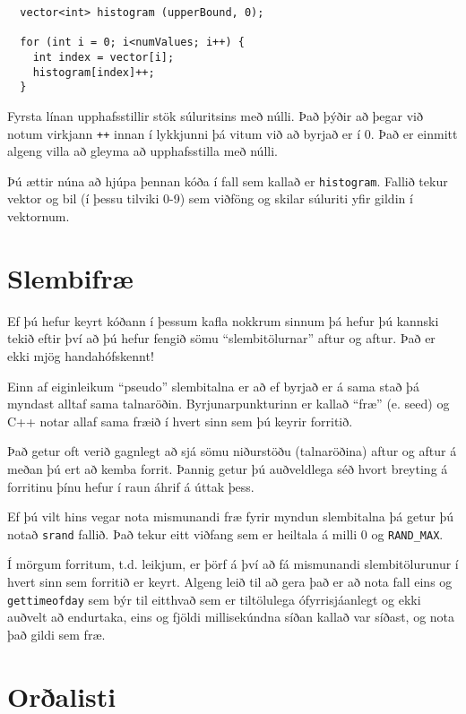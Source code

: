 \begin{verbatim}
  vector<int> histogram (upperBound, 0);

  for (int i = 0; i<numValues; i++) {
    int index = vector[i];
    histogram[index]++;
  }
\end{verbatim}
%
Fyrsta línan upphafsstillir stök súluritsins með núlli.
Það þýðir að þegar við notum virkjann {\tt ++} innan í lykkjunni þá vitum við að byrjað er í 0.
Það er einmitt algeng villa að gleyma að upphafsstilla með núlli.

Þú ættir núna að hjúpa þennan kóða í fall sem kallað er {\tt histogram}.
Fallið tekur vektor og bil (í þessu tilviki 0-9) sem viðföng og skilar súluriti yfir gildin í vektornum.

\section{Slembifræ}

Ef þú hefur keyrt kóðann í þessum kafla nokkrum sinnum þá hefur þú kannski tekið eftir því að þú hefur fengið sömu ``slembitölurnar'' aftur og aftur.
Það er ekki mjög handahófskennt!

Einn af eiginleikum ``pseudo'' slembitalna er að ef byrjað er á sama stað þá myndast alltaf sama talnaröðin.
Byrjunarpunkturinn er kallað ``fræ'' (e. seed) og C++ notar allaf sama fræið í hvert sinn sem þú keyrir forritið.

Það getur oft verið gagnlegt að sjá sömu niðurstöðu (talnaröðina) aftur og aftur á meðan þú ert að kemba forrit.
Þannig getur þú auðveldlega séð hvort breyting á forritinu þínu hefur í raun áhrif á úttak þess.

Ef þú vilt hins vegar nota mismunandi fræ fyrir myndun slembitalna þá getur þú notað {\tt srand} fallið.
Það tekur eitt viðfang sem er heiltala á milli 0 og {\tt RAND\_MAX}.

Í mörgum forritum, t.d. leikjum, er þörf á því að fá mismunandi slembitölurunur í hvert sinn sem forritið er keyrt.
Algeng leið til að gera það er að nota fall eins og {\tt gettimeofday} sem býr til eitthvað sem er tiltölulega ófyrrisjáanlegt og ekki auðvelt að endurtaka,
eins og fjöldi millisekúndna síðan kallað var síðast, og nota það gildi sem fræ.

\section{Orðalisti}

